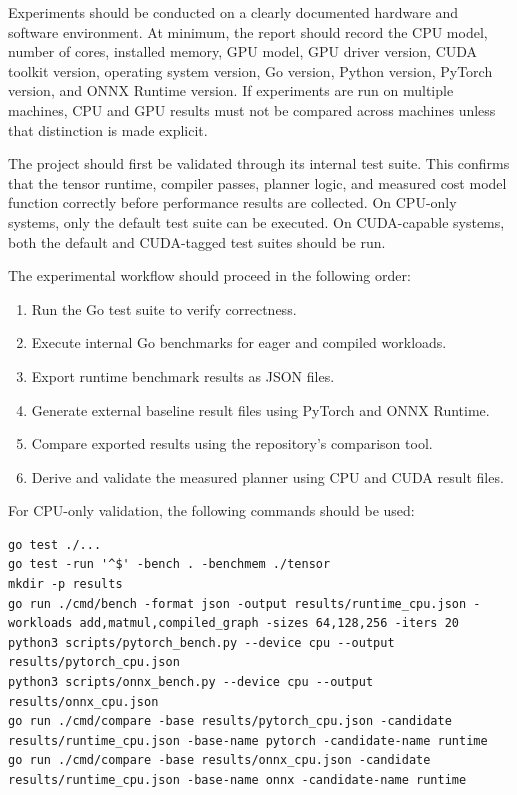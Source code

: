 \documentclass[12pt]{article}
\begin{document}
Experiments should be conducted on a clearly documented hardware and software environment. At minimum, the report should record the CPU model, number of cores, installed memory, GPU model, GPU driver version, CUDA toolkit version, operating system version, Go version, Python version, PyTorch version, and ONNX Runtime version. If experiments are run on multiple machines, CPU and GPU results must not be compared across machines unless that distinction is made explicit.

The project should first be validated through its internal test suite. This confirms that the tensor runtime, compiler passes, planner logic, and measured cost model function correctly before performance results are collected. On CPU-only systems, only the default test suite can be executed. On CUDA-capable systems, both the default and CUDA-tagged test suites should be run.

The experimental workflow should proceed in the following order:
\begin{enumerate}
    \item Run the Go test suite to verify correctness.
    \item Execute internal Go benchmarks for eager and compiled workloads.
    \item Export runtime benchmark results as JSON files.
    \item Generate external baseline result files using PyTorch and ONNX Runtime.
    \item Compare exported results using the repository's comparison tool.
    \item Derive and validate the measured planner using CPU and CUDA result files.
\end{enumerate}

For CPU-only validation, the following commands should be used:

\begin{verbatim}
go test ./...
go test -run '^$' -bench . -benchmem ./tensor
mkdir -p results
go run ./cmd/bench -format json -output results/runtime_cpu.json -workloads add,matmul,compiled_graph -sizes 64,128,256 -iters 20
python3 scripts/pytorch_bench.py --device cpu --output results/pytorch_cpu.json
python3 scripts/onnx_bench.py --device cpu --output results/onnx_cpu.json
go run ./cmd/compare -base results/pytorch_cpu.json -candidate results/runtime_cpu.json -base-name pytorch -candidate-name runtime
go run ./cmd/compare -base results/onnx_cpu.json -candidate results/runtime_cpu.json -base-name onnx -candidate-name runtime
\end{verbatim}
\end{document}
